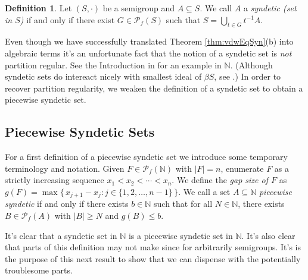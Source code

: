 \documentclass[12pt,showtrims]{memoir}
\theoremstyle{plain}
\theoremstyle{definition}
\newtheorem{defn}[thm]{Definition}
\newcommand{\bbN}{\mathbb{N}}
\newcommand{\Pf}{\mathcal{P}_f}
\begin{document}
\begin{defn}
  Let $(S, \cdot)$ be a semigroup and $A \subseteq S$.
  We call $A$ a \textsl{syndetic (set in $S$)} if and only if there exist $G \in \Pf(S)$ such that $S = \bigcup_{t \in G} t^{-1}A$. 
\end{defn}

Even though we have successfully translated Theorem \ref{thm:vdwEqSyn}(b) into algebraic terms it's an unfortunate fact that the notion of a syndetic set is \textsl{not} partition regular. 
See the Introduction in \cite{Bergelson:2001ve} for an example in $\bbN$.
(Although syndetic sets do intereact nicely with smallest ideal of $\beta S$, see \cite[Theorems 4.39 and 4.43]{Hindman:1998fk}.)
In order to recover partition regularity, we weaken the definition of a syndetic set to obtain a piecewise syndetic set.

\subsection{Piecewise Syndetic Sets}
For a first definition of a piecewise syndetic set we introduce some temporary terminology and notation.
Given $F \in \Pf(\bbN)$ with $|F| = n$, enumerate $F$ as a strictly increasing sequence $x_1 < x_2 < \cdots < x_n$. 
We define the \textsl{gap size of $F$} as $g(F) = \max\bigr\{\, x_{j+1} - x_j : j \in \{1, 2, \ldots, n-1\} \,\bigl\}$.
We call a set $A \subseteq \bbN$ \textsl{piecewise syndetic} if and only if there exists $b \in \bbN$ such that for all $N \in \bbN$, there exists $B \in \Pf(A)$ with $|B| \ge N$ and $g(B) \le b$.

It's clear that a syndetic set in $\bbN$ is a piecewise syndetic set in $\bbN$.
It's also clear that  parts of this definition may not make since for arbitrarily semigroups.
It's is the purpose of this next result to show that we can dispense with the potentially troublesome parts.
\end{document}
